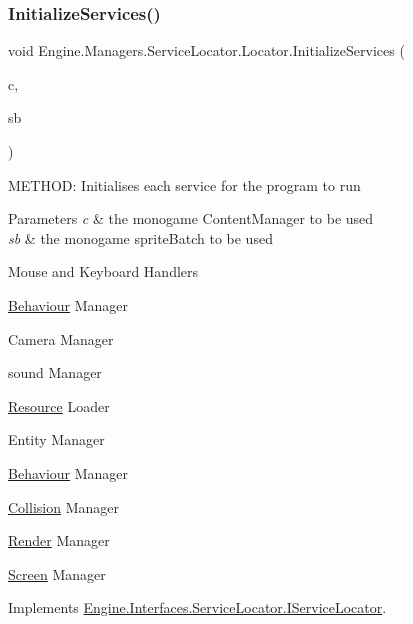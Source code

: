 \mbox{\label{a00542_a34bc6f5d735512bae556d2ec65a7bda7}} 
\subsubsection{\texorpdfstring{Initialize\+Services()}{InitializeServices()}}
{\footnotesize\ttfamily void Engine.\+Managers.\+Service\+Locator.\+Locator.\+Initialize\+Services (\begin{DoxyParamCaption}\item[{Content\+Manager}]{c,  }\item[{Sprite\+Batch}]{sb }\end{DoxyParamCaption})\hspace{0.3cm}{\ttfamily [inline]}}



M\+E\+T\+H\+OD\+: Initialises each service for the program to run 


\begin{DoxyParams}{Parameters}
{\em c} & the monogame Content\+Manager to be used\\
\hline
{\em sb} & the monogame sprite\+Batch to be used\\
\hline
\end{DoxyParams}
Mouse and Keyboard Handlers

\hyperlink{a00266}{Behaviour} Manager

Camera Manager

sound Manager

\hyperlink{a00272}{Resource} Loader

Entity Manager

\hyperlink{a00266}{Behaviour} Manager

\hyperlink{a00268}{Collision} Manager

\hyperlink{a00271}{Render} Manager

\hyperlink{a00273}{Screen} Manager 

Implements \hyperlink{a00474_a4bf9f6979adf99eda26320a420262991}{Engine.\+Interfaces.\+Service\+Locator.\+I\+Service\+Locator}.

\mbox{\label{a00542_a2a2ead2e1ed9a2d63b59ab34621b0812}} 
